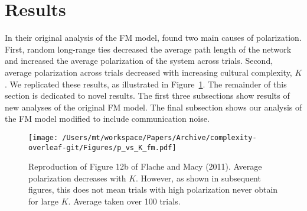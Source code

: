 \section{Results}

In their original analysis of the FM model,  found two main causes of polarization. First, random long-range ties decreased the average path length of the network and increased the average polarization of the system across trials. Second, 
average polarization across trials decreased with increasing cultural complexity, $K$.
We replicated these results, as illustrated in Figure~\ref{fig:pVsKFM}. 
The remainder of this section is dedicated to novel results. The first three subsections show results of new analyses of the original FM model. The final subsection shows our analysis of the FM model modified to include communication noise.

\begin{figure}[H]
  \centering
    \texttt{[image: /Users/mt/workspace/Papers/Archive/complexity-overleaf-git/Figures/p\_vs\_K\_fm.pdf]}
  \caption{Reproduction of Figure 12b of Flache and Macy (2011). Average
    polarization decreases with $K$. However, as shown in subsequent figures,
    this does not mean trials with high polarization never obtain for large $K$. Average
    taken over 100 trials.
  }
  \label{fig:pVsKFM}
\end{figure}



